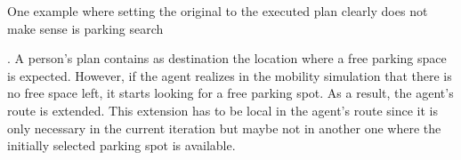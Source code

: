 


One example where setting the original to the executed plan clearly does not make sense is parking search %

\citep[][]{WaraichEtAl_unpub_TRB_2013, Waraich_unpub_IATBR_2012}.
%
A person's plan contains as destination the location where a free parking space is expected. However, if the agent realizes in the mobility simulation that there is no free space left, it starts looking for a free parking spot. As a result, the agent's route is extended. This extension has to be local in the agent's route since it is only necessary in the current iteration
but maybe not in another one where the initially selected parking spot is available.



